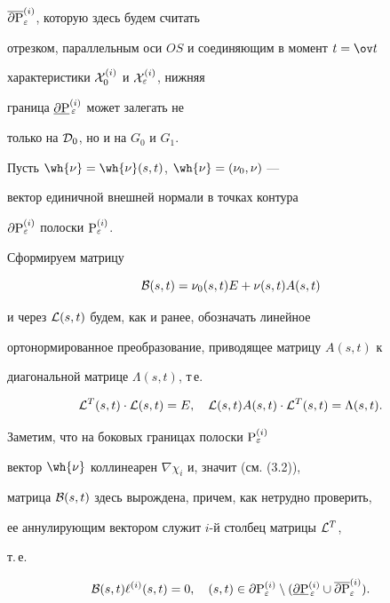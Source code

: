 $\overline{\partial{\P}}_{\varepsilon}^{(i)}$, которую здесь будем считать


отрезком, параллельным оси $OS$ и соединяющим в момент $t = \ov t$


характеристики ${\cal X}_{0}^{(i)}$ и ${\cal X}_{\varepsilon}^{(i)}$, нижняя


граница $\underline{\partial {\P}}{}_{\,\varepsilon}^{(i)}$ может залегать не


только на ${\cal D}_0$, но и на $G_0$ и $G_1$.





Пусть $\wh{\nu} = \wh{\nu}(s,t)$, $\wh{\nu} = (\nu_{0}, \nu)$ ---


вектор единичной внешней нормали в точках контура


$\partial {\P}_{\varepsilon}^{(i)}$ полоски ${\P}_{\varepsilon}^{(i)}$.


Сформируем матрицу


$$


{\cal B}(s,t) = \nu_{0}(s,t)E + \nu(s,t)A(s,t)


$$


и через ${\cal L}(s,t)$ будем, как и ранее, обозначать линейное


ортонормированное преобразование, приводящее матрицу $A(s,t)$ к


диагональной матрице $\Lambda (s,t)$, т\,е.


$${\cal L}^{T}(s,t) \cdot {\cal L}(s,t) = E,\quad


{\cal L}(s,t)A(s,t)\cdot{\cal L}^{T}(s,t) = \Lambda(s,t).


$$





Заметим, что на боковых границах полоски ${\P}_{\varepsilon}^{(i)}$


вектор $\wh{\nu}$ коллинеарен $\nabla \chi_{i}$ и, значит (см. (3.2)),


матрица ${\cal B}(s,t)$ здесь вырождена, причем, как нетрудно проверить,


ее аннулирующим вектором служит $i$-й столбец матрицы ${\cal L}^{T}$,


т.\,е.


\begin{equation}


{\cal B}(s,t) \ell^{(i)}(s,t) = 0,\quad


(s,t) \in \partial{\P}_{\varepsilon}^{(i)} \setminus


(\underline{\partial{\P}}{}_{\,\varepsilon}^{(i)} \cup


\overline{\partial{\P}}_{\varepsilon}^{(i)}).


\end{equation}





